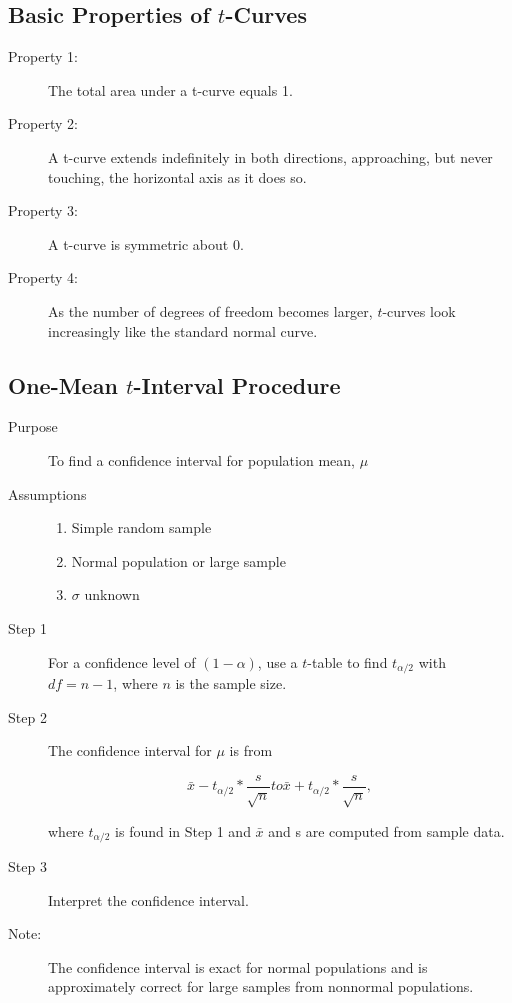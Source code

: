 \documentclass[12pt]{article}
\begin{document}
        \subsection*{Basic Properties of $t$-Curves}
            \begin{description}
                \item[Property 1:] The total area under a t-curve equals 1.
                \item[Property 2:] A t-curve extends indefinitely in both directions,
                approaching, but never touching, the horizontal axis as it does so.
                \item[Property 3:] A t-curve is symmetric about 0.
                \item[Property 4:] As the number of degrees of freedom becomes larger,
                $t$-curves look increasingly like the standard normal curve.   
            \end{description}
        \subsection*{One-Mean $t$-Interval Procedure}
            \begin{description}
                \item[Purpose] To find a confidence interval for population mean, $\mu$
                \item[Assumptions]
                \begin{enumerate}
                    \item Simple random sample
                    \item Normal population or large sample
                    \item $\sigma$ unknown                    
                \end{enumerate}  
                \item[Step 1] For a confidence level of $(1-\alpha)$, use a $t$-table to find 
                $t_{\alpha/2}$ with $df = n-1$, where $n$ is the sample size.
                \item[Step 2] The confidence interval for $\mu$ is from
                \begin{center}
                    \[
                        \bar{x} - t_{\alpha/2}*\frac{s}{\sqrt{n}} to
                        \bar{x} + t_{\alpha/2}*\frac{s}{\sqrt{n}},    
                    \]                        
                \end{center} 
                where $t_{\alpha/2}$ is found in Step 1 and $\bar{x}$ and s are computed from
                sample data.
                \item[Step 3] Interpret the confidence interval.
                \item[Note:] The confidence interval is exact for normal populations and is 
                approximately correct for large samples from nonnormal populations.
            \end{description}
\end{document}
